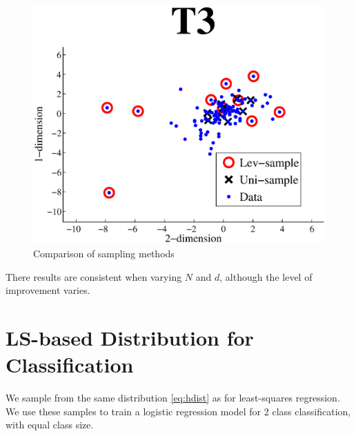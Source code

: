 \hspace{.06\linewidth}
\begin{minipage}{.35\linewidth}
\begin{figure}[H]
    \caption{Comparison of sampling methods}
    \includegraphics[width=.9\linewidth]{02460_poster_template/images/selection.eps}

\end{figure}
\end{minipage}

There results are consistent when varying $N$ and $d$, although the level of improvement varies.
%
\section{LS-based Distribution for Classification}

We sample from the same distribution \eqref{eq:hdist} as for least-squares regression. We use these samples to train a logistic regression model for 2 class classification, with equal class size.
  

